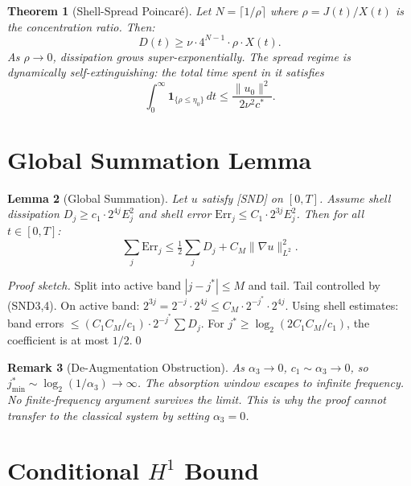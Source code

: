 \documentclass[11pt]{article}
\newtheorem{theorem}{Theorem}[section]
\newtheorem{lemma}[theorem]{Lemma}
\newtheorem{remark}[theorem]{Remark}
\begin{document}
\begin{theorem}[Shell-Spread Poincar\'e]\label{thm:poincare}
Let $N = \lceil 1/\rho\rceil$ where $\rho = J(t)/X(t)$ is the concentration ratio. Then:
\[
D(t) \geq \nu\cdot 4^{N-1}\cdot\rho\cdot X(t).
\]
As $\rho\to 0$, dissipation grows super-exponentially. The spread regime is dynamically
self-extinguishing: the total time spent in it satisfies
\[
\int_0^\infty \mathbf{1}_{\{\rho\leq\eta_0\}}\,dt \leq \frac{\|u_0\|^2}{2\nu^2 c^*}.
\]
\end{theorem}

\section{Global Summation Lemma}

\begin{lemma}[Global Summation]\label{lem:gsl}
Let $u$ satisfy \emph{[SND]} on $[0,T]$. Assume shell dissipation
$D_j \geq c_1\cdot 2^{4j} E_j^2$ and shell error
$\mathrm{Err}_j \leq C_1\cdot 2^{3j} E_j^2$.
Then for all $t\in[0,T]$:
\[
\sum_j \mathrm{Err}_j \leq \tfrac{1}{2}\sum_j D_j + C_M\|\nabla u\|^2_{L^2}.
\]
\end{lemma}

\begin{proof}[Proof sketch]
Split into active band $|j-j^*|\leq M$ and tail.
Tail controlled by (SND3,4). On active band:
$2^{3j} = 2^{-j}\cdot 2^{4j} \leq C_M\cdot 2^{-j^*}\cdot 2^{4j}$.
Using shell estimates: band errors $\leq (C_1 C_M/c_1)\cdot 2^{-j^*}\sum D_j$.
For $j^*\geq\log_2(2C_1 C_M/c_1)$, the coefficient is at most $1/2$.\qed
\end{proof}

\begin{remark}[De-Augmentation Obstruction]
As $\alpha_3\to 0$, $c_1\sim\alpha_3\to 0$, so $j^*_{\min}\sim\log_2(1/\alpha_3)\to\infty$.
The absorption window escapes to infinite frequency. No finite-frequency argument survives
the limit. \textit{This is why the proof cannot transfer to the classical system by setting
$\alpha_3=0$.}
\end{remark}

\section{Conditional $H^1$ Bound}
\end{document}
